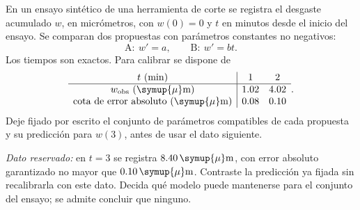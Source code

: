 En un ensayo sintético de una herramienta de corte se registra el desgaste acumulado \(w\), en micrómetros, con \(w(0)=0\) y \(t\) en minutos desde el inicio del ensayo. Se comparan dos propuestas con parámetros constantes no negativos:
\[
\mathrm A:\ w'=a,\qquad \mathrm B:\ w'=bt.
\]
Los tiempos son exactos. Para calibrar se dispone de
\[
\begin{array}{c|cc}t\ (\mathrm{min})&1&2\\\hline
w_{\rm obs}\ (\symup{\mu}\mathrm{m})&1.02&4.02\\
\text{cota de error absoluto}\ (\symup{\mu}\mathrm{m})&0.08&0.10
\end{array}.
\]
Deje fijado por escrito el conjunto de parámetros compatibles de cada propuesta y su predicción para \(w(3)\), antes de usar el dato siguiente.

\emph{Dato reservado:} en \(t=3\) se registra \(8.40\,\symup{\mu}\mathrm{m}\), con error absoluto garantizado no mayor que \(0.10\,\symup{\mu}\mathrm{m}\). Contraste la predicción ya fijada sin recalibrarla con este dato. Decida qué modelo puede mantenerse para el conjunto del ensayo; se admite concluir que ninguno.

